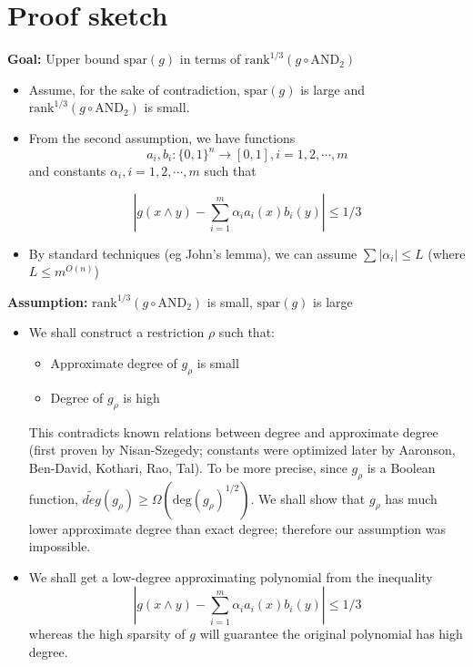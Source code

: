 
\section{Proof sketch}
\begin{frame}
\textbf{Goal: }Upper bound $\text{spar}(g)$ in terms of $\text{rank}^{1/3} (g \circ \text{AND}_2)$

\begin{itemize}
	\item<1-> Assume, for the sake of contradiction, $\text{spar}(g)$ is large and $\text{rank}^{1/3} (g \circ \text{AND}_2)$ is small.
	\item<2-> From the second assumption, we have functions
	$$ a_i, b_i : \{0,1\}^n \rightarrow [0,1] , i= 1, 2, \cdots , m$$
	and constants $\alpha_i, i = 1, 2, \cdots , m$ such that
	
	$$\left| g(x \land y) - \displaystyle \sum_{i=1}^{m} \alpha_i a_i(x)  b_i(y)\right| \leq 1/3$$
	\item<2-> By standard techniques (eg John's lemma), we can assume $\sum |\alpha_i| \leq L$ (where $L \leq m^{O(n)}$)
\end{itemize}

\end{frame}

\begin{frame}
	\textbf{Assumption: }$\text{rank}^{1/3} (g \circ \text{AND}_2)$ is small, $\text{spar}(g)$ is large
	
	\begin{itemize}
		\item<1-> We shall construct a restriction $\rho$ such that:
		\begin{itemize}
			\item Approximate degree of $g_{\rho}$ is small
			\item Degree of $g_{\rho}$ is high
		\end{itemize}
		This contradicts known relations between degree and approximate degree (first proven by Nisan-Szegedy; constants were optimized later by Aaronson, Ben-David, Kothari, Rao, Tal). To be more precise, since $g_{\rho}$ is a Boolean function, $\tilde{deg}(g_{\rho}) \geq \Omega(\text{deg}(g_{\rho})^{1/2})$. We shall show that $g_{\rho}$ has much lower approximate degree than exact degree; therefore our assumption was impossible.
		
		\item<2-> We shall get a low-degree approximating polynomial from the inequality 
			$$\left| g(x \land y) - \displaystyle \sum_{i=1}^{m} \alpha_i a_i(x)b_i(y)\right| \leq 1/3$$
			whereas the high sparsity of $g$ will guarantee the original polynomial has high degree.
	\end{itemize}
	
\end{frame}


